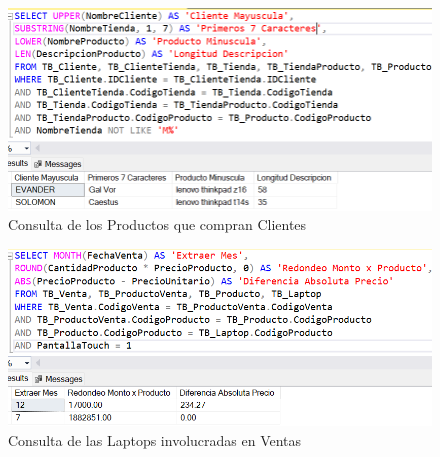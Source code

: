 \begin{figure}[H]
  \centering
  \includegraphics[scale = 0.7]{Imagenes/sql/4.consultas/consulta_cliente_producto.png}
  \caption{Consulta de los Productos que compran Clientes}
\end{figure}

\begin{figure}[H]
  \centering
  \includegraphics[scale = 0.7]{Imagenes/sql/4.consultas/consulta_venta_laptop.png}
  \caption{Consulta de las Laptops involucradas en Ventas}
\end{figure}